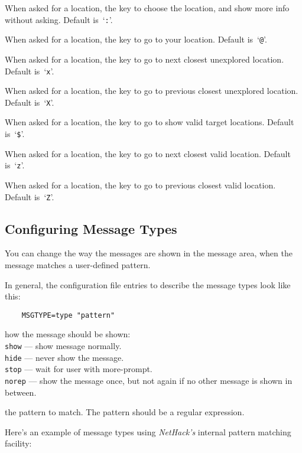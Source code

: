 When asked for a location, the key to choose the location, and show more
info without asking. Default is~`{\tt :}'.
\item[{\bb{getpos.self}}]
When asked for a location, the key to go to your location.
Default is~`{\tt @}'.
\item[{\bb{getpos.unexplored.next}}]
When asked for a location, the key to go to next closest unexplored location.
Default is~`{\tt x}'.
\item[{\bb{getpos.unexplored.prev}}]
When asked for a location, the key to go to previous closest unexplored
location. Default is~`{\tt X}'.
\item[{\bb{getpos.valid}}]
When asked for a location, the key to go to show valid target locations.
Default is~`{\tt \$}'.
\item[{\bb{getpos.valid.next}}]
When asked for a location, the key to go to next closest valid location.
Default is~`{\tt z}'.
\item[{\bb{getpos.valid.prev}}]
When asked for a location, the key to go to previous closest valid location.
Default is~`{\tt Z}'.
\elist


\subsection*{Configuring Message Types}

You can change the way the messages are shown in the message area, when
the message matches a user-defined pattern.

In general, the configuration file entries to describe the message types
look like this:
\begin{verbatim}
    MSGTYPE=type "pattern"
\end{verbatim}
\blist{}
\item[\ib{type}]
how the message should be shown:
\\
{\tt show}  --- show message normally.\\
{\tt hide}  --- never show the message.\\
{\tt stop}  --- wait for user with more-prompt.\\
{\tt norep} --- show the message once, but not again if no other message is
shown in between.
\item[\ib{pattern}]
the pattern to match. The pattern should be a regular expression.
\elist

Here's an example of message types using {\it NetHack's\/} internal
pattern matching facility:

